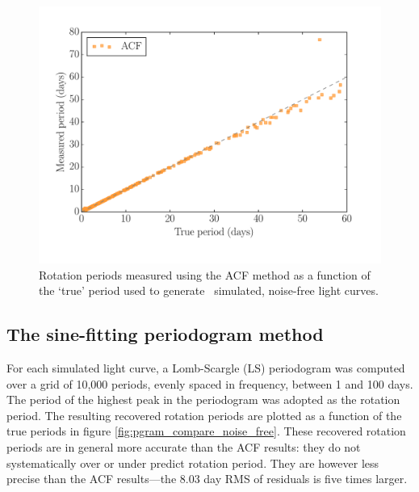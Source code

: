 \begin{figure}
\begin{center}
\includegraphics[width=6in, clip=true]{figures/compare_acf.pdf}
\caption[ACF results.]
{Rotation periods measured using the ACF method as a function of the
`true' period used to generate \nlightcurves\ simulated, noise-free light
curves.}
\end{center}
\end{figure}
\label{fig:compare_noise_free}

\subsection{The sine-fitting periodogram method}

For each simulated light curve, a Lomb-Scargle (LS) periodogram
\citep{Lomb1976, Scargle1982} was computed over a grid of 10,000 periods,
evenly spaced in frequency, between 1 and 100 days.
The period of the highest peak in the periodogram was adopted as the rotation
period.
The resulting recovered rotation periods are plotted as a function of the true
periods in figure \ref{fig:pgram_compare_noise_free}.
These recovered rotation periods are in general more accurate than the ACF
results: they do not systematically over or under predict rotation period.
They are however less precise than the ACF results---the 8.03 day RMS of
residuals is five times larger.

